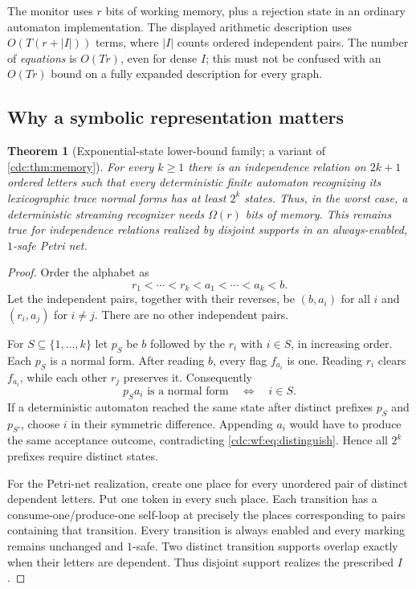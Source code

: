 \documentclass[11pt,a4paper]{article}
\newtheorem{theorem}{Theorem}[section]
\theoremstyle{definition}
\theoremstyle{remark}
\begin{document}
The monitor uses $r$ bits of working memory, plus a rejection state in an ordinary automaton implementation. The displayed arithmetic description uses $O(T(r+|I|))$ terms, where $|I|$ counts ordered independent pairs. The number of \emph{equations} is $O(Tr)$, even for dense $I$; this must not be confused with an $O(Tr)$ bound on a fully expanded description for every graph.

\subsection{Why a symbolic representation matters}
\begin{theorem}[Exponential-state lower-bound family; a variant of \cref{cdc:thm:memory}]\label{cdc:wf:thm:memory}
For every $k\geq1$ there is an independence relation on $2k+1$ ordered letters such that every deterministic finite automaton recognizing its lexicographic trace normal forms has at least $2^k$ states. Thus, in the worst case, a deterministic streaming recognizer needs $\Omega(r)$ bits of memory. This remains true for independence relations realized by disjoint supports in an always-enabled, $1$-safe Petri net.
\end{theorem}
\begin{proof}
Order the alphabet as
\[
 r_1<\cdots<r_k<a_1<\cdots<a_k<b.
\]
Let the independent pairs, together with their reverses, be $(b,a_i)$ for all $i$ and $(r_i,a_j)$ for $i\ne j$. There are no other independent pairs.

For $S\subseteq\{1,\ldots,k\}$ let $p_S$ be $b$ followed by the $r_i$ with $i\in S$, in increasing order. Each $p_S$ is a normal form. After reading $b$, every flag $f_{a_i}$ is one. Reading $r_i$ clears $f_{a_i}$, while each other $r_j$ preserves it. Consequently
\begin{equation}\label{cdc:wf:eq:distinguish}
 p_Sa_i\text{ is a normal form}\quad\Longleftrightarrow\quad i\in S.
\end{equation}
If a deterministic automaton reached the same state after distinct prefixes $p_S$ and $p_{S'}$, choose $i$ in their symmetric difference. Appending $a_i$ would have to produce the same acceptance outcome, contradicting \eqref{cdc:wf:eq:distinguish}. Hence all $2^k$ prefixes require distinct states.

For the Petri-net realization, create one place for every unordered pair of distinct dependent letters. Put one token in every such place. Each transition has a consume-one/produce-one self-loop at precisely the places corresponding to pairs containing that transition. Every transition is always enabled and every marking remains unchanged and $1$-safe. Two distinct transition supports overlap exactly when their letters are dependent. Thus disjoint support realizes the prescribed $I$.
\end{proof}
\end{document}
